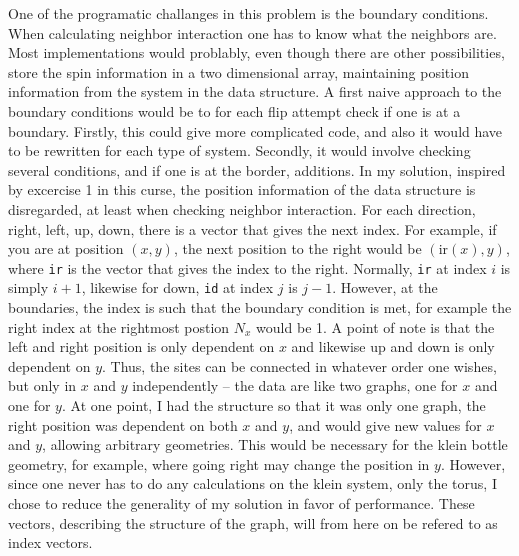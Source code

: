 \documentclass{article}
\begin{document}
One of the programatic challanges in this problem is the boundary conditions.
When calculating neighbor interaction one has to know what the neighbors are.
Most implementations would problably, even though there are other possibilities, store the spin information in a two dimensional array, maintaining position information from the system in the data structure.
A first naive approach to the boundary conditions would be to for each flip attempt check if one is at a boundary.
Firstly, this could give more complicated code, and also it would have to be rewritten for each type of system.
Secondly, it would involve checking several conditions, and if one is at the border, additions.
In my solution, inspired by excercise 1 in this curse, the position information of the data structure is disregarded, at least when checking neighbor interaction.
For each direction, right, left, up, down, there is a vector that gives the next index.
For example, if you are at position $(x, y)$, the next position to the right would be $(\text{ir}(x), y)$, where \verb|ir| is the vector that gives the index to the right.
Normally, \verb|ir| at index $i$ is simply $i+1$, likewise for down, \verb|id| at index $j$ is $j-1$.
However, at the boundaries, the index is such that the boundary condition is met, for example the right index at the rightmost postion $N_x$ would be 1.
A point of note is that the left and right position is only dependent on $x$ and likewise up and down is only dependent on $y$.
Thus, the sites can be connected in whatever order one wishes, but only in $x$ and $y$ independently -- the data are like two graphs, one for $x$ and one for $y$.
At one point, I had the structure so that it was only one graph, the right position was dependent on both $x$ and $y$, and would give new values for $x$ and $y$, allowing arbitrary geometries.
This would be necessary for the klein bottle geometry, for example, where going right may change the position in $y$.
However, since one never has to do any calculations on the klein system, only the torus, I chose to reduce the generality of my solution in favor of performance.
These vectors, describing the structure of the graph, will from here on be refered to as index vectors.
\end{document}
